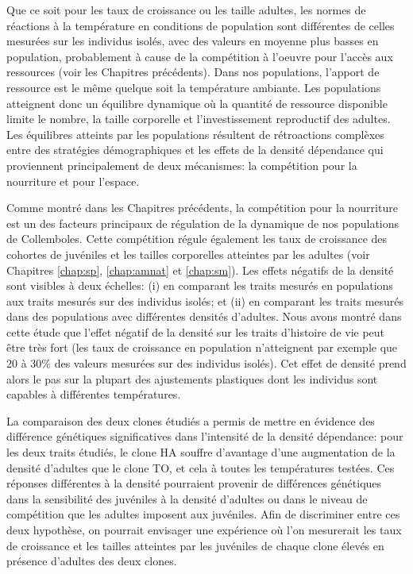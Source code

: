 Que ce soit pour les taux de croissance ou les taille adultes, les normes de
réactions à la température en conditions de population sont différentes de
celles mesurées sur les individus isolés, avec des valeurs en moyenne plus
basses en population, probablement à cause de la compétition à l'oeuvre pour
l'accès aux ressources (voir les Chapitres précédents). Dans nos populations,
l'apport de ressource est le même quelque soit la température ambiante. Les
populations atteignent donc un équilibre dynamique où la quantité de ressource
disponible limite le nombre, la taille corporelle et l'investissement
reproductif des adultes. Les équilibres atteints par les populations résultent
de rétroactions complèxes entre des stratégies démographiques
\autocites[dépendantes des clones,][]{tully2008a,stam1996a} et les effets de la
densité dépendance \autocites{kokko2007a} qui proviennent principalement de deux
mécanismes: la compétition pour la nourriture et pour l'espace. 

Comme montré dans les Chapitres précédents, la compétition pour la nourriture
est un des facteurs principaux de régulation de la dynamique de
nos populations de Collemboles. Cette compétition régule également les taux de
croissance des cohortes de juvéniles et les tailles corporelles atteintes par
les adultes (voir Chapitres \ref{chap:sp}, \ref{chap:amnat} et \ref{chap:sm}).
Les effets négatifs de la densité sont visibles à deux échelles: (i) en
comparant les traits mesurés en populations aux traits mesurés sur des individus
isolés; et (ii) en comparant les traits mesurés dans des populations avec
différentes densités d'adultes. Nous avons montré dans cette étude que l'effet
négatif de la densité sur les traits d'histoire de vie peut être très fort (les
taux de croissance en population n'atteignent par exemple que 20 à $30\%$ des
valeurs mesurées sur des individus isolés). Cet effet de densité prend alors le
pas sur la plupart des ajustements plastiques dont les individus sont capables à
différentes températures. 

La comparaison des deux clones étudiés a permis de mettre en évidence des
différence génétiques significatives dans l'intensité de la densité dépendance:
pour les deux traits étudiés, le clone HA souffre d'avantage d'une augmentation
de la densité d'adultes que le clone TO, et cela à toutes les températures
testées. Ces réponses différentes à la densité pourraient provenir de
différences génétiques dans la sensibilité des juvéniles à la densité d'adultes
ou dans le niveau de compétition que les adultes imposent aux juvéniles. Afin de
discriminer entre ces deux hypothèse, on pourrait envisager une expérience où
l'on mesurerait les taux de croissance et les tailles atteintes par les juvéniles
de chaque clone élevés en présence d'adultes des deux clones. 

